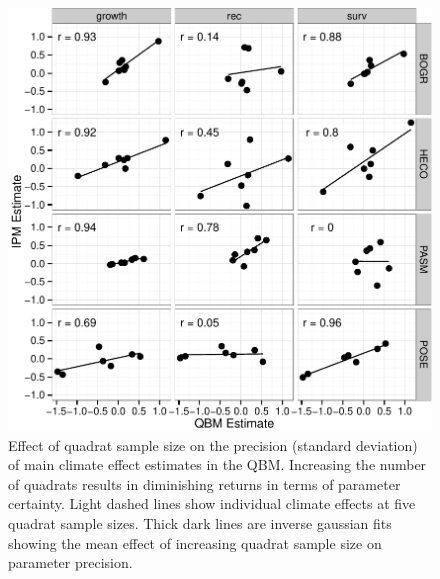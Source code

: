 \documentclass[12pt,]{article}
\begin{document}
\begin{figure}[htbp]
\centering
\includegraphics{components/figure/manuscript-figure_5.pdf}
\caption{Effect of quadrat sample size on the precision (standard
deviation) of main climate effect estimates in the QBM. Increasing the
number of quadrats results in diminishing returns in terms of parameter
certainty. Light dashed lines show individual climate effects at five
quadrat sample sizes. Thick dark lines are inverse gaussian fits showing
the mean effect of increasing quadrat sample size on parameter
precision.}
\end{figure}
\end{document}
